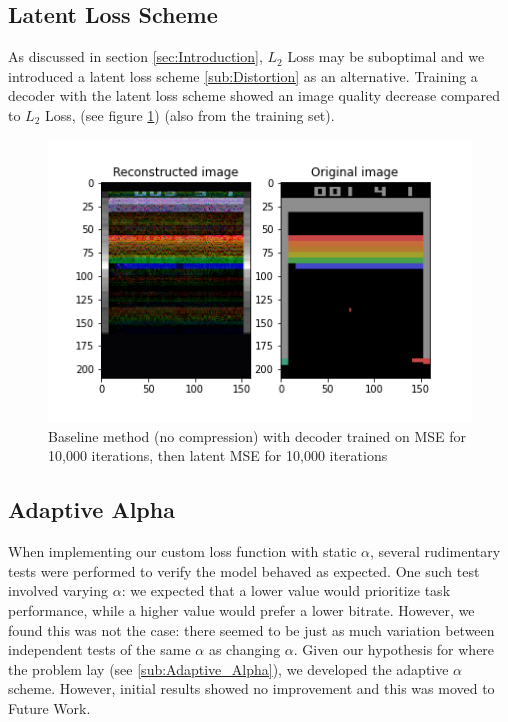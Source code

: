 \subsection{Latent Loss Scheme}
As discussed in section \ref{sec:Introduction}, $L_2$ Loss may be suboptimal and
we introduced a latent loss scheme \ref{sub:Distortion} as an alternative.
Training a decoder with the latent loss scheme showed an image quality decrease
compared to $L_2$ Loss, (see figure \ref{fig:baseline_MSE_latent}) (also from
the training set).

\begin{figure}[H]
    \centering
    \includegraphics[width=\linewidth]{images/orig_reconstructed_rl3.0.png}
    \caption{Baseline method (no compression) with decoder trained on MSE for 10,000 iterations, then latent MSE for 10,000 iterations}
    \label{fig:baseline_MSE_latent}
\end{figure}

\subsection{Adaptive Alpha}\label{sub:adaptive_alpha_exp}
When implementing our custom loss function with static $\alpha$, several
rudimentary tests were performed to verify the model behaved as expected. One
such test involved varying $\alpha$: we expected that a lower value would
prioritize task performance, while a higher value would prefer a lower bitrate.
However, we found this was not the case: there seemed to be just as much
variation between independent tests of the same $\alpha$ as changing $\alpha$.
Given our hypothesis for where the problem lay (see \ref{sub:Adaptive_Alpha}),
we developed the adaptive $\alpha$ scheme. However, initial results showed no
improvement and this was moved to Future Work.

